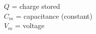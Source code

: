 \documentclass[preview]{standalone}
\begin{document}
\begin{center}
$Q$ = charge stored \\ $C_m$ = capacitance (constant) \\$V_m$ = voltage
\end{center}
\end{document}
